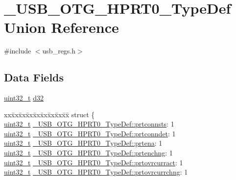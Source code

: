 \hypertarget{union___u_s_b___o_t_g___h_p_r_t0___type_def}{\section{\-\_\-\-U\-S\-B\-\_\-\-O\-T\-G\-\_\-\-H\-P\-R\-T0\-\_\-\-Type\-Def Union Reference}
\label{union___u_s_b___o_t_g___h_p_r_t0___type_def}
}


{\ttfamily \#include $<$usb\-\_\-regs.\-h$>$}

\subsection*{Data Fields}
\begin{DoxyCompactItemize}
\item 
\hyperlink{stdint_8h_a435d1572bf3f880d55459d9805097f62}{uint32\-\_\-t} \hyperlink{group___u_s_b___o_t_g___d_r_i_v_e_r_ga12e80fae082acbf526a1042c213b9a2b}{d32}
\item 
\begin{tabbing}
xx\=xx\=xx\=xx\=xx\=xx\=xx\=xx\=xx\=\kill
struct \{\\
\>\hyperlink{stdint_8h_a435d1572bf3f880d55459d9805097f62}{uint32\_t} \hyperlink{group___u_s_b___o_t_g___d_r_i_v_e_r_ga80c85f29776c859b982bffa2d57a61c0}{\_USB\_OTG\_HPRT0\_TypeDef::prtconnsts}: 1\\
\>\hyperlink{stdint_8h_a435d1572bf3f880d55459d9805097f62}{uint32\_t} \hyperlink{group___u_s_b___o_t_g___d_r_i_v_e_r_ga7c3212cf708588fcd8823f2fe4c171af}{\_USB\_OTG\_HPRT0\_TypeDef::prtconndet}: 1\\
\>\hyperlink{stdint_8h_a435d1572bf3f880d55459d9805097f62}{uint32\_t} \hyperlink{group___u_s_b___o_t_g___d_r_i_v_e_r_ga36818f9fe8a4bbdeb764b5426ea40a52}{\_USB\_OTG\_HPRT0\_TypeDef::prtena}: 1\\
\>\hyperlink{stdint_8h_a435d1572bf3f880d55459d9805097f62}{uint32\_t} \hyperlink{group___u_s_b___o_t_g___d_r_i_v_e_r_ga328646f280716f47c42621dd7e06f0a9}{\_USB\_OTG\_HPRT0\_TypeDef::prtenchng}: 1\\
\>\hyperlink{stdint_8h_a435d1572bf3f880d55459d9805097f62}{uint32\_t} \hyperlink{group___u_s_b___o_t_g___d_r_i_v_e_r_ga01b37bd5f68839474255967be14ae78c}{\_USB\_OTG\_HPRT0\_TypeDef::prtovrcurract}: 1\\
\>\hyperlink{stdint_8h_a435d1572bf3f880d55459d9805097f62}{uint32\_t} \hyperlink{group___u_s_b___o_t_g___d_r_i_v_e_r_ga02e861d33c684c8025cce67ce2ef59e8}{\_USB\_OTG\_HPRT0\_TypeDef::prtovrcurrchng}: 1\\

\end{tabbing}
\end{DoxyCompactItemize}
